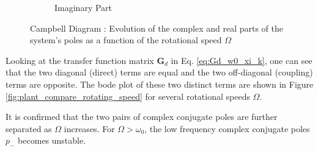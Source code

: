 \documentclass{ISMA_USD2020}
\begin{document}
\begin{figure}[htbp]
\begin{subfigure}[c]{0.4\linewidth}
\caption{\label{fig:campbell_diagram_imag} Imaginary Part}
\end{subfigure}
\caption{\label{fig:campbell_diagram}Campbell Diagram : Evolution of the complex and real parts of the system's poles as a function of the rotational speed \(\Omega\)}
\centering
\end{figure}

Looking at the transfer function matrix \(\bm{G}_d\) in Eq. \eqref{eq:Gd_w0_xi_k}, one can see that the two diagonal (direct) terms are equal and the two off-diagonal (coupling) terms are opposite.
The bode plot of these two distinct terms are shown in Figure \ref{fig:plant_compare_rotating_speed} for several rotational speeds \(\Omega\).

It is confirmed that the two pairs of complex conjugate poles are further separated as \(\Omega\) increases.
For \(\Omega > \omega_0\), the low frequency complex conjugate poles \(p_{-}\) becomes unstable.
\end{document}
